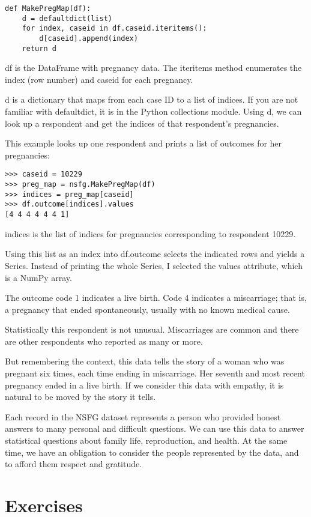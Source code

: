 \documentclass[]{book}
\begin{document}
\begin{verbatim}
def MakePregMap(df):
    d = defaultdict(list)
    for index, caseid in df.caseid.iteritems():
        d[caseid].append(index)
    return d
\end{verbatim}

df is the DataFrame with pregnancy
data. The iteritems method
enumerates the index (row number) and caseid for each pregnancy.

d is a dictionary that maps from
each case ID to a list of indices. If you are not familiar with defaultdict, it is in the Python
collections module. Using
d, we can look up a
respondent and get the indices of that respondent's pregnancies.

This example looks up one respondent and
prints a list of outcomes for her pregnancies:

\begin{verbatim}
>>> caseid = 10229
>>> preg_map = nsfg.MakePregMap(df)
>>> indices = preg_map[caseid]
>>> df.outcome[indices].values
[4 4 4 4 4 4 1]
\end{verbatim}

indices is the list of indices for
pregnancies corresponding to respondent 10229.

Using this list as an index into df.outcome selects the indicated
rows and yields a Series. Instead of printing the whole Series, I
selected the values
attribute, which is a NumPy array.

The outcome code 1 indicates a live birth. Code
4 indicates a miscarriage;
that is, a pregnancy that ended spontaneously, usually with no known
medical cause.

Statistically this respondent is not
unusual. Miscarriages are common and there are other respondents who
reported as many or more.

But remembering the context, this data
tells the story of a woman who was pregnant six times, each time ending
in miscarriage. Her seventh and most recent pregnancy ended in a live
birth. If we consider this data with empathy, it is natural to be moved
by the story it tells.

Each record in the NSFG dataset
represents a person who provided honest answers to many personal and
difficult questions. We can use this data to answer statistical
questions about family life, reproduction, and health. At the same time,
we have an obligation to consider the people represented by the data,
and to afford them respect and gratitude.

\hypertarget{exercises}{%
\section{Exercises}\label{exercises}}
\end{document}
